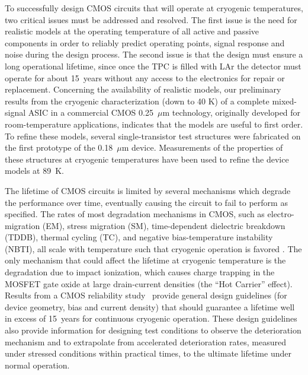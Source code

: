 To successfully design CMOS circuits that will operate at cryogenic 
temperatures, two critical issues must be addressed and resolved. 
The first issue is the need for realistic models at the operating temperature 
of all active and passive components in order to reliably predict operating points,
signal response and noise during the design process.
The second issue is that the design must ensure a long operational lifetime, since once the TPC is filled 
with LAr the detector must operate for about 15~years without any access to the 
electronics for repair or replacement.
Concerning the availability of realistic models, 
our preliminary results from the cryogenic characterization (down to 40 K) of a complete 
mixed-signal ASIC \cite{CMOS-Compton} in a commercial CMOS 0.25~$\mu$m technology, 
originally developed for room-temperature applications, indicates that the models 
are useful to first order.
To refine these models, several 
single-transistor test structures were fabricated on the first prototype of the 0.18~$\mu$m device. 
Measurements of the properties of these structures at cryogenic temperatures 
have been used to refine the device models at 89~K. 

The lifetime of CMOS circuits is limited by several mechanisms which degrade 
the performance over time, eventually causing the circuit to fail to perform as specified. 
The rates of most degradation mechanisms in CMOS, such as electro-migration (EM), 
stress migration (SM), time-dependent dielectric breakdown (TDDB), thermal cycling (TC), 
and negative bias-temperature instability (NBTI), all scale with temperature such that 
cryogenic operation is favored \cite{CMOS-lifetime}\cite{PMOS-model}. The only mechanism 
that could affect the lifetime at cryogenic temperature is the degradation due to 
impact ionization, which causes charge trapping in the MOSFET gate oxide at 
large drain-current densities (the ``Hot Carrier'' effect). Results from a CMOS reliability study~\cite{CMOS-reliability} 
provide general design guidelines (for device geometry, bias and current density) 
that should guarantee a lifetime well in excess of 15~years for continuous cryogenic operation. 
These design guidelines also provide information for designing test conditions to observe the 
deterioration mechanism and to extrapolate from accelerated deterioration rates, 
measured under stressed conditions within practical times, to the ultimate lifetime under normal operation.

